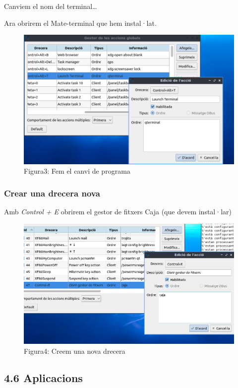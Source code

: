 \documentclass[
  a4paper,
]{article}
\begin{document}
Canviem el nom del terminal\ldots{}

Ara obrirem el Mate-terminal que hem instal·lat.

\begin{figure}
\centering
\includegraphics{png/Drecera2.png}
\caption{Figura3: Fem el canvi de programa}
\end{figure}

\subsubsection{Crear una drecera nova}\label{crear-una-drecera-nova}

Amb \emph{Control + E} obrirem el gestor de fitxers Caja (que devem
instal·lar)

\begin{figure}
\centering
\includegraphics{png/Drecera3.png}
\caption{Figura4: Creem una nova drecera}
\end{figure}

\subsection{4.6 Aplicacions}\label{aplicacions}
\end{document}
